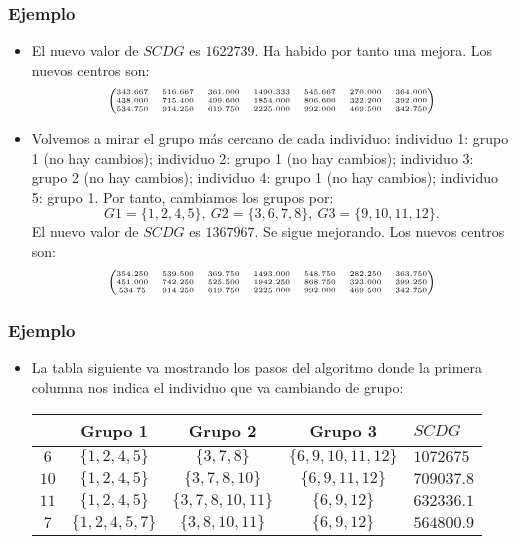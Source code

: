 \begin{frame}
\frametitle{Ejemplo}
\begin{itemize}
\item<2->{El nuevo valor de $SCDG$ es $1622739$. Ha habido por tanto una mejora. Los nuevos centros son:
$$
{\tiny \begin{pmatrix}
343.667 & 516.667 & 361.000 &  1490.333 &  545.667 & 270.000 &  364.000 \\
438.000 & 715.400 &  499.600 & 1854.000 &  806.600 &  322.200 &  392.000  \\
534.750 & 914.250 &  619.750 &  2225.000 &  992.000 & 469.500 &  342.750 \\
\end{pmatrix}}
$$}
\item<3->{Volvemos a mirar el grupo más cercano de cada individuo: individuo 1: grupo 1 (no hay cambios); individuo 2: grupo 1 (no hay cambios); individuo 3: grupo 2 (no hay cambios); individuo 4:  grupo 1 (no hay cambios); individuo 5: grupo 1. Por tanto, cambiamos los grupos por: 
$$
G1 = \{ 1,2,4,5\},\ G2 = \{3,6,7,8\},\ G3 = \{ 9,10,11,12\}.
$$
El nuevo valor de $SCDG$ es $1367967$. Se sigue mejorando. Los nuevos centros son:
$$
{\tiny \begin{pmatrix}
354.250 &  539.500 &  369.750 &  1493.000 &  548.750 &  282.250 &  363.750 \\
451.000 &  742.250 &  525.500 &  1942.250 &  868.750 &  323.000 &  399.250 \\
534.75 & 914.250 &  619.750 &  2225.000 &  992.000 &  469.500 & 342.750 \\
\end{pmatrix}}
$$}
\end{itemize}
\end{frame}

\begin{frame}
\frametitle{Ejemplo}
\begin{itemize}
\item<2->{La tabla siguiente va mostrando los pasos del algoritmo donde la primera columna nos indica el individuo que va cambiando de grupo:
\begin{center}
{\tiny\begin{tabular}{|c|c|c|c|l|}\hline
&Grupo 1& Grupo 2& Grupo 3&$SCDG$\\\hline
$6$&$\{1,2,4,5\}$&$\{3,7,8\}$&$\{6,9,10,11,12\}$&$1072675$\\\hline
$10$&$\{1,2,4,5\}$&$\{3,7,8,10\}$&$\{6,9,11,12\}$&$709037.8$\\\hline
$11$&$\{1,2,4,5\}$&$\{3,7,8,10,11\}$&$\{6,9,12\}$&$632336.1$\\\hline
$7$&$\{1,2,4,5,7\}$&$\{3,8,10,11\}$&$\{6,9,12\}$&$564800.9$\\\hline
\end{tabular}}
\end{center}}
\end{itemize}
\end{frame}
